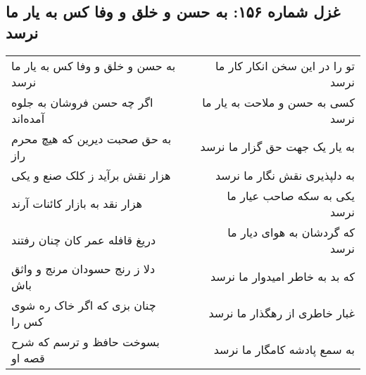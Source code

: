 \begin{center}
\section*{غزل شماره ۱۵۶: به حسن و خلق و وفا کس به یار ما نرسد}
\label{sec:sh156}
\begin{longtable}{l p{0.5cm} r}
به حسن و خلق و وفا کس به یار ما نرسد
&&
تو را در این سخن انکار کار ما نرسد
\\
اگر چه حسن فروشان به جلوه آمده‌اند
&&
کسی به حسن و ملاحت به یار ما نرسد
\\
به حق صحبت دیرین که هیچ محرم راز
&&
به یار یک جهت حق گزار ما نرسد
\\
هزار نقش برآید ز کلک صنع و یکی
&&
به دلپذیری نقش نگار ما نرسد
\\
هزار نقد به بازار کائنات آرند
&&
یکی به سکه صاحب عیار ما نرسد
\\
دریغ قافله عمر کان چنان رفتند
&&
که گردشان به هوای دیار ما نرسد
\\
دلا ز رنج حسودان مرنج و واثق باش
&&
که بد به خاطر امیدوار ما نرسد
\\
چنان بزی که اگر خاک ره شوی کس را
&&
غبار خاطری از رهگذار ما نرسد
\\
بسوخت حافظ و ترسم که شرح قصه او
&&
به سمع پادشه کامگار ما نرسد
\\
\end{longtable}
\end{center}
